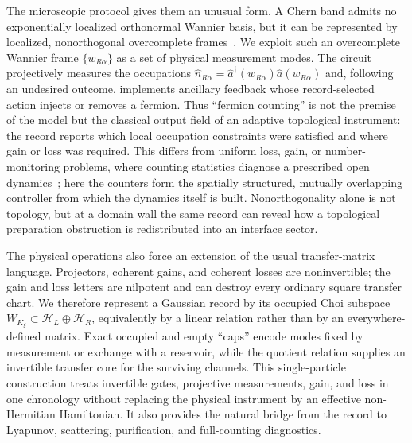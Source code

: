 \documentclass[aps,prl,twocolumn,nofootinbib,superscriptaddress]{revtex4-2}
\begin{document}
The microscopic protocol gives them an unusual form.  A Chern band admits no exponentially localized orthonormal Wannier basis, but it can be represented by localized, nonorthogonal overcomplete frames~\cite{Brouder2007,DubailRead2015,LiDongLedwithKhalaf2024}.  We exploit such an overcomplete Wannier frame $\{w_{R\alpha}\}$ as a set of physical measurement modes.  The circuit projectively measures the occupations $\hat n_{R\alpha}=\hat a^\dagger(w_{R\alpha})\hat a(w_{R\alpha})$ and, following an undesired outcome, implements ancillary feedback whose record-selected action injects or removes a fermion.  Thus ``fermion counting'' is not the premise of the model but the classical output field of an adaptive topological instrument: the record reports which local occupation constraints were satisfied and where gain or loss was required.  This differs from uniform loss, gain, or number-monitoring problems, where counting statistics diagnose a prescribed open dynamics~\cite{Soares2025,Starchl2025,Landi2024}; here the counters form the spatially structured, mutually overlapping controller from which the dynamics itself is built.  Nonorthogonality alone is not topology, but at a domain wall the same record can reveal how a topological preparation obstruction is redistributed into an interface sector.

The physical operations also force an extension of the usual transfer-matrix language.  Projectors, coherent gains, and coherent losses are noninvertible; the gain and loss letters are nilpotent and can destroy every ordinary square transfer chart.  We therefore represent a Gaussian record by its occupied Choi subspace $W_{K_\xi}\subset\mathcal H_L\oplus\mathcal H_R$, equivalently by a linear relation rather than by an everywhere-defined matrix.  Exact occupied and empty ``caps'' encode modes fixed by measurement or exchange with a reservoir, while the quotient relation supplies an invertible transfer core for the surviving channels.  This single-particle construction treats invertible gates, projective measurements, gain, and loss in one chronology without replacing the physical instrument by an effective non-Hermitian Hamiltonian.  It also provides the natural bridge from the record to Lyapunov, scattering, purification, and full-counting diagnostics.
\end{document}

